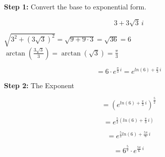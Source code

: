 \documentclass{ximera}
\begin{document}
\textbf{\textcolor{blue!55!black}{Step 1:}} Convert the base to exponential form.


\[
3 + 3\sqrt{3} \, i
\]


$\sqrt{3^2 + (3\sqrt{3})^2} = \sqrt{9 + 9 \cdot 3} = \sqrt{36} = 6$ \\

$\arctan\left( \frac{3\sqrt{3}}{3}  \right) = \arctan\left( \sqrt{3}  \right) = \frac{\pi}{3}$



\[
= 6 \cdot e^{\tfrac{\pi}{3} \, i} = e^{ln(6) + \tfrac{\pi}{3} \, i}
\]



\textbf{\textcolor{blue!55!black}{Step 2:}} The Exponent



\[
= \left( e^{ln(6) + \tfrac{\pi}{3} \, i} \right)^{\tfrac{5}{2}} 
\]


\[
= e^{\tfrac{5}{2} (ln(6) + \tfrac{\pi}{3} \, i)}
\]



\[
= e^{\tfrac{5}{2} ln(6) + \tfrac{5\pi}{6} \, i}
\]


\[
= 6^{\tfrac{5}{2}} \cdot e^{\tfrac{5\pi}{6} \, i}
\]
\end{document}
